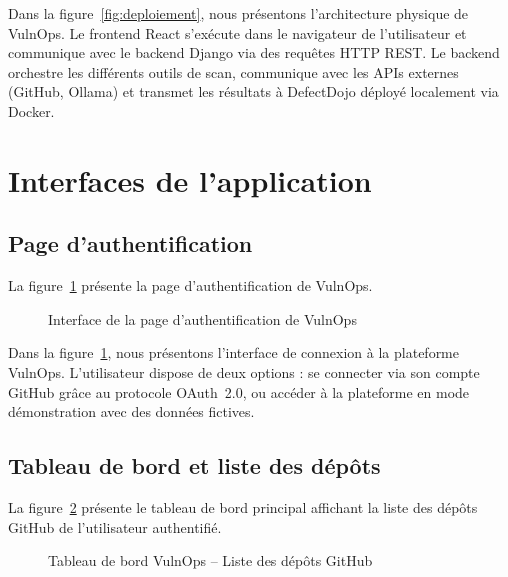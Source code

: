 \documentclass[12pt, a4paper, oneside]{report}
\begin{document}
Dans la figure~\ref{fig:deploiement}, nous présentons l'architecture physique
de VulnOps. Le frontend React s'exécute dans le navigateur de l'utilisateur
et communique avec le backend Django via des requêtes HTTP REST. Le backend
orchestre les différents outils de scan, communique avec les APIs externes
(GitHub, Ollama) et transmet les résultats à DefectDojo déployé localement
via Docker.

\section{Interfaces de l'application}
\label{sec:interfaces}

\subsection{Page d'authentification}

La figure~\ref{fig:ui_login} présente la page d'authentification de VulnOps.

\begin{figure}[H]
    \centering
    \caption{Interface de la page d'authentification de VulnOps}
    \label{fig:ui_login}
\end{figure}

Dans la figure~\ref{fig:ui_login}, nous présentons l'interface de connexion
à la plateforme VulnOps. L'utilisateur dispose de deux options : se connecter
via son compte GitHub grâce au protocole OAuth~2.0, ou accéder à la plateforme
en mode démonstration avec des données fictives.

\subsection{Tableau de bord et liste des dépôts}

La figure~\ref{fig:ui_dashboard} présente le tableau de bord principal affichant
la liste des dépôts GitHub de l'utilisateur authentifié.

\begin{figure}[H]
    \centering
    \caption{Tableau de bord VulnOps -- Liste des dépôts GitHub}
    \label{fig:ui_dashboard}
\end{figure}
\end{document}
